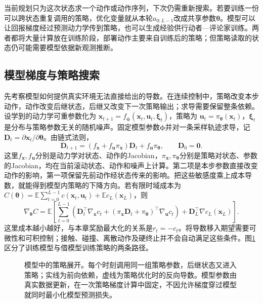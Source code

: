 当前规划只为这次状态求一个动作或动作序列，下次仍需重新搜索。若要训练一份可以跨状态重复调用的策略，优化变量就从本轮$a_{0:L-1}$改成共享参数$\bm\theta$。模型可以让回报梯度经过预测动力学传到策略，也可以生成经验供行动者—评论家训练。两者都将大量计算放在训练阶段，部署动作主要来自训练后的策略；但策略读取的状态仍可能需要模型依据新观测推断。

\subsection{模型梯度与策略搜索}
\label{sec:rl-learning-model-gradient}

先考察模型如何提供真实环境无法直接给出的导数。在连续控制中，策略改变本步动作，动作改变后继状态，后继又改变下一次策略输出；求导需要保留整条依赖。设学到的动力学可重参数化为
$\bm x_{t+1}=f_{\bm\phi}(\bm x_t,\bm u_t,\bm\xi_t)$，策略为
$\bm u_t=\pi_{\bm\theta}(\bm x_t)$，$\bm\xi_t$是分布与策略参数无关的随机噪声。固定模型参数$\bm\phi$并对一条采样轨迹求导，记
$\bm D_t=\partial\bm x_t/\partial\bm\theta$。由链式法则，
\begin{equation}
  \bm D_{t+1}
   =\left(f_{\bm x}+f_{\bm u}\pi_{\bm x}\right)\bm D_t
       +f_{\bm u}\pi_{\bm\theta},\qquad \bm D_0=\bm0.
  \label{eq:rl-learning-model-chain}
\end{equation}
这里$f_{\bm x},f_{\bm u}$分别是动力学对状态、动作的Jacobian，$\pi_{\bm x},\pi_{\bm\theta}$分别是策略对状态、参数的Jacobian，均在当前滚动状态、动作和噪声上计算。第二项是本步参数直接改变动作的影响，第一项保留先前动作经状态传来的影响。把这些敏感度乘上成本导数，就能得到模型内策略的下降方向。若有限时域成本为
$C(\bm\theta)=\mathbb E\sum_{t=0}^{L-1}c(\bm x_t,\bm u_t)+
\mathbb E c_L(\bm x_L)$，则
\[
 \nabla_{\bm\theta}C
  =\mathbb E\left[
    \sum_{t=0}^{L-1}
      \left(\bm D_t^\top\nabla_{\bm x}c_t+
       (\pi_{\bm x}\bm D_t+\pi_{\bm\theta})^\top
                                       \nabla_{\bm u}c_t\right)
          +\bm D_L^\top\nabla c_L(\bm x_L)\right].
\]
这里成本越小越好，与本章奖励最大化的关系是$r_t=-c_t$。将导数移入期望需要可微性和可积控制；接触、碰撞、离散动作及硬终止并不会自动满足这些条件。图\ref{fig:rl-learning-model-gradient}区分了训练模型与借模型训练策略的两条路径。

\begin{figure}[t]
  \centering
  
  \caption{模型中的策略展开。每个时刻调用同一组策略参数，后继状态又进入策略；实线为前向依赖，虚线为策略优化时的反向导数。模型参数由真实数据更新，在一次策略梯度计算中固定，不因允许梯度穿过模型就同时最小化模型预测损失。}
  \label{fig:rl-learning-model-gradient}
\end{figure}

